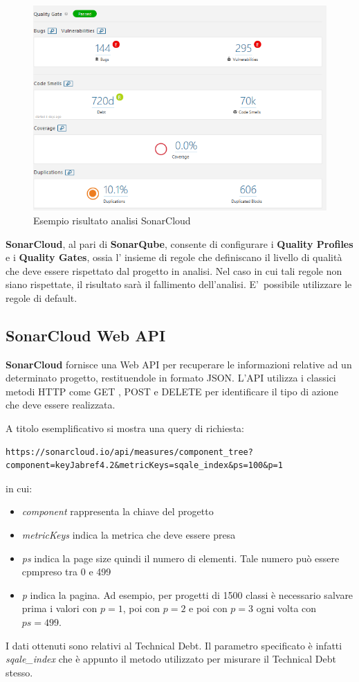 \begin{figure}[htbp]
	\centering
	\includegraphics[scale=0.5, trim = 0cm 0cm 0cm 0cm, clip=true]{figSonarCloud/analisi.PNG}
	\caption{Esempio risultato analisi SonarCloud}
	\label{fig:analisi}
\end{figure}

\textbf{SonarCloud}, al pari di \textbf{SonarQube}, consente di configurare i \textbf{Quality Profiles} e i \textbf{Quality Gates}, ossia l' insieme di regole che definiscano il livello di qualità che deve essere rispettato dal progetto in analisi. Nel caso in cui tali regole non siano rispettate, il risultato sarà il fallimento dell'analisi. E'\ possibile utilizzare le regole di default. 

\subsection{SonarCloud Web API}
\textbf{SonarCloud} fornisce una Web API per recuperare le informazioni relative ad un determinato progetto, restituendole in formato JSON. L'API utilizza i classici metodi HTTP come GET , POST e DELETE per identificare il tipo di azione che deve essere realizzata. 

A titolo esemplificativo si mostra una query di richiesta:
\begin{verbatim}
https://sonarcloud.io/api/measures/component_tree?
component=keyJabref4.2&metricKeys=sqale_index&ps=100&p=1
\end{verbatim}

in cui:
\begin{itemize}
	\item \textit{component} rappresenta la chiave del progetto
	\item \textit{metricKeys} indica la metrica che deve essere presa
	\item \textit{ps} indica la page size quindi il numero di elementi. Tale numero può essere cpmpreso tra 0 e 499
	\item \textit{p} indica la pagina. Ad esempio, per progetti di 1500 classi è necessario salvare prima i valori con $p=1$, poi con $p=2$ e poi con $p=3$ ogni volta con $ps=499$.
\end{itemize}

I dati ottenuti sono relativi al Technical Debt. Il parametro specificato è infatti \textit{sqale\_index} che è appunto il metodo utilizzato per misurare il Technical Debt stesso. 
